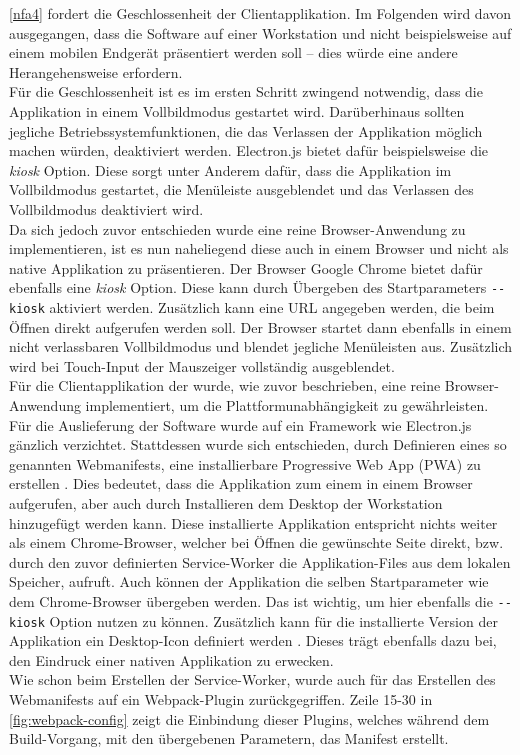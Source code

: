 \ref{nfa4} fordert die Geschlossenheit der Clientapplikation. Im Folgenden wird davon ausgegangen, 
dass die Software auf einer Workstation und nicht beispielsweise auf einem mobilen Endgerät präsentiert
werden soll -- dies würde eine andere Herangehensweise erfordern.\\
Für die Geschlossenheit ist es im ersten Schritt zwingend notwendig, dass die Applikation in einem 
Vollbildmodus gestartet wird. Darüberhinaus sollten jegliche Betriebssystemfunktionen, die das 
Verlassen der Applikation möglich machen würden, deaktiviert werden. Electron.js bietet dafür beispielsweise
die \emph{kiosk} Option. Diese sorgt unter Anderem dafür, dass die Applikation im Vollbildmodus gestartet, 
die Menüleiste ausgeblendet und das Verlassen des Vollbildmodus deaktiviert wird.\\
Da sich jedoch zuvor entschieden wurde eine reine Browser-Anwendung zu implementieren, ist es nun naheliegend 
diese auch in einem Browser und nicht als native Applikation zu präsentieren. Der Browser Google Chrome bietet
dafür ebenfalls eine \emph{kiosk} Option. Diese kann durch Übergeben des Startparameters \texttt{-{}-kiosk}
aktiviert werden. Zusätzlich kann eine URL angegeben werden, die beim Öffnen direkt aufgerufen werden soll.
Der Browser startet dann ebenfalls in einem nicht verlassbaren Vollbildmodus und blendet jegliche Menüleisten aus.
Zusätzlich wird bei Touch-Input der Mauszeiger vollständig ausgeblendet.\\

Für die Clientapplikation der \shst{} wurde, wie zuvor beschrieben, eine reine Browser-Anwendung implementiert,
um die Plattformunabhängigkeit zu gewährleisten. Für die Auslieferung der Software wurde auf ein Framework wie
Electron.js gänzlich verzichtet. Stattdessen wurde sich entschieden, durch Definieren eines so genannten Webmanifests,
eine installierbare Progressive Web App (PWA) zu erstellen \cite{web-app-manifest}. Dies bedeutet, 
dass die Applikation zum einem in einem Browser aufgerufen, aber auch durch Installieren dem Desktop 
der Workstation hinzugefügt werden kann. Diese installierte Applikation entspricht nichts 
weiter als einem Chrome-Browser, welcher bei Öffnen die gewünschte Seite direkt,
bzw. durch den zuvor definierten Service-Worker die Applikation-Files aus dem lokalen Speicher, aufruft. Auch
können der Applikation die selben Startparameter wie dem Chrome-Browser übergeben werden. Das ist wichtig,
um hier ebenfalls die \texttt{-{}-kiosk} Option nutzen zu können.
Zusätzlich kann für die installierte Version der Applikation ein Desktop-Icon definiert werden \cite{web-app-manifest}.
Dieses trägt ebenfalls dazu bei, den Eindruck einer nativen Applikation zu erwecken.\\
Wie schon beim Erstellen der Service-Worker, wurde auch für das Erstellen des Webmanifests auf ein 
Webpack-Plugin \cite{webpack-pwa-manifest-plugin} zurückgegriffen. Zeile 15-30 in \autoref{fig:webpack-config} 
zeigt die Einbindung dieser Plugins, welches während dem Build-Vorgang, mit den übergebenen Parametern, das Manifest erstellt. 
